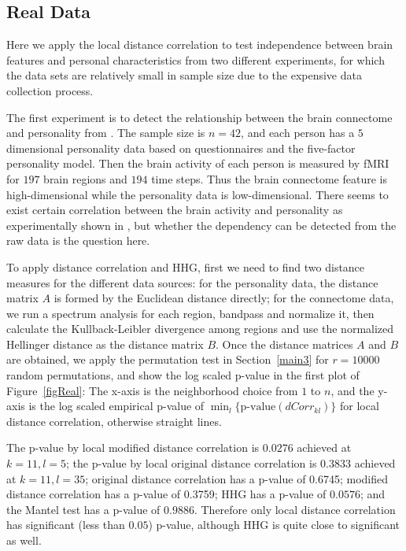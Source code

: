 \documentclass[12pt]{article}
\begin{document}
\subsection{Real Data}
\label{numer2}
Here we apply the local distance correlation to test independence between brain features and personal characteristics from two different experiments, for which the data sets are relatively small in sample size due to the expensive data collection process. 

The first experiment is to detect the relationship between the brain connectome and personality from \cite{AdelsteinEtAl2011}. The sample size is $n=42$, and each person has a $5$ dimensional personality data based on questionnaires and the five-factor personality model. Then the brain activity of each person is measured by fMRI for $197$ brain regions and $194$ time steps. Thus the brain connectome feature is high-dimensional while the personality data is low-dimensional. There seems to exist certain correlation between the brain activity and personality as experimentally shown in \cite{AdelsteinEtAl2011}, but whether the dependency can be detected from the raw data is the question here.

To apply distance correlation and HHG, first we need to find two distance measures for the different data sources: for the personality data, the distance matrix $A$ is formed by the Euclidean distance directly; for the connectome data, we run a spectrum analysis for each region, bandpass and normalize it, then calculate the Kullback-Leibler divergence among regions and use the normalized Hellinger distance as the distance matrix $B$. Once the distance matrices $A$ and $B$ are obtained, we apply the permutation test in Section~\ref{main3} for $r=10000$ random permutations, and show the log scaled p-value in the first plot of Figure~\ref{figReal}: The x-axis is the neighborhood choice from $1$ to $n$, and the y-axis is the log scaled empirical p-value of $\min_{l} \{\mbox{p-value}(dCorr_{kl})\}$ for local distance correlation, otherwise straight lines. 

The p-value by local modified distance correlation is $0.0276$ achieved at $k=11, l=5$; the p-value by local original distance correlation is $0.3833$ achieved at $k=11, l=35$; original distance correlation has a p-value of 0.6745; modified distance correlation has a p-value of 0.3759; HHG has a p-value of $0.0576$; and the Mantel test has a p-value of $0.9886$. Therefore only local distance correlation has significant (less than $0.05$) p-value, although HHG is quite close to significant as well.
\end{document}
